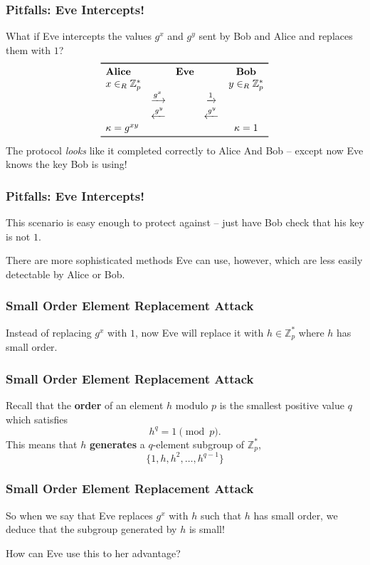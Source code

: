 \documentclass{beamer}
\newcommand{\<}{\langle}
\renewcommand{\>}{\rangle}
\newcommand{\Z}{\mathbb{Z}}
\begin{document}
\begin{frame}
\frametitle{Pitfalls: Eve Intercepts!}

What if Eve intercepts the values $g^x$ and $g^y$ sent by Bob and Alice and replaces them with $1$?
\[
\begin{array}{lcccccr}
\toprule
\textbf{Alice} &&\textbf{Eve}&& \textbf{Bob}  \\

x \in_R \Z_p^*&&&& y \in_R \Z_p^* \\

& \xrightarrow{ g^x} &&\xrightarrow{1}&\\

&\xleftarrow{g^y}&& \xleftarrow { g^y }  \\

\kappa = g^{xy} &&&& \kappa = 1  \\
\bottomrule
\end{array}
\]
The protocol \emph{looks} like it completed correctly to Alice And Bob -- except now Eve knows the key Bob is using!
\end{frame}

\begin{frame}
\frametitle{Pitfalls: Eve Intercepts!}

This scenario is easy enough to protect against -- just have Bob check that his key is not $1$. \newline

There are more sophisticated methods Eve can use, however, which are less easily detectable by Alice or Bob. 
\end{frame}


\begin{frame}
\frametitle{Small Order Element Replacement Attack}

Instead of replacing $g^x$ with $1$, now Eve will replace it with $h\in\Z_p^*$ where $h$ has small order. 
\end{frame}



\begin{frame}
\frametitle{Small Order Element Replacement Attack}

Recall that the \textbf{order} of an element $h$ modulo $p$ is the smallest positive value $q$ which satisfies 
\[
h^q = 1 \pmod p.
\]
This means that $h$ \textbf{generates}  a $q$-element subgroup of $\Z_p^*$,
\[
\{1, h, h^2, \dots, h^{q-1}\}
\]
\end{frame}


\begin{frame}
\frametitle{Small Order Element Replacement Attack}

So when we say that Eve replaces $g^x$ with $h$ such that $h$ has small order, we deduce that the subgroup generated by $h$ is small! \newline

How can Eve use this to her advantage?
\end{frame}
\end{document}
